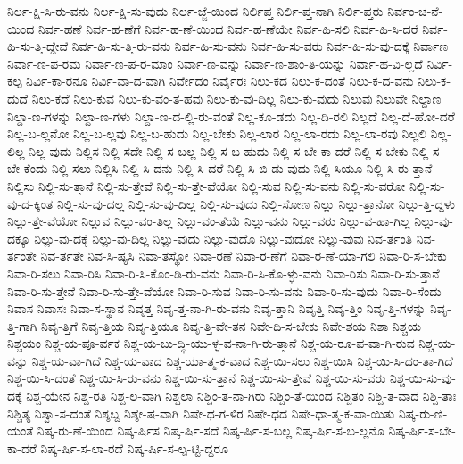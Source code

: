 {ನಿರ್ಲ-ಕ್ಷಿ-ಸಿ-ರು-ವನು
ನಿರ್ಲ-ಕ್ಷಿ-ಸು-ವುದು
ನಿರ್ಲ-ಜ್ಜೆ-ಯಿಂದ
ನಿರ್ಲಿಪ್ತ
ನಿರ್ಲಿ-ಪ್ತ-ನಾಗಿ
ನಿರ್ಲಿ-ಪ್ತರು
ನಿರ್ವಂ-ಚ-ನೆ-ಯಿಂದ
ನಿರ್ವ-ಹಣೆ
ನಿರ್ವ-ಹ-ಣೆಗೆ
ನಿರ್ವ-ಹ-ಣೆ-ಯಿಂದ
ನಿರ್ವ-ಹ-ಣೆಯೇ
ನಿರ್ವ-ಹಿ-ಸಲಿ
ನಿರ್ವ-ಹಿ-ಸಿ-ದರೆ
ನಿರ್ವ-ಹಿ-ಸು-ತ್ತಿ-ದ್ದೇವೆ
ನಿರ್ವ-ಹಿ-ಸು-ತ್ತಿ-ರು-ವನು
ನಿರ್ವ-ಹಿ-ಸು-ವನು
ನಿರ್ವ-ಹಿ-ಸು-ವರು
ನಿರ್ವ-ಹಿ-ಸು-ವು-ದಕ್ಕೆ
ನಿರ್ವಾಣ
ನಿರ್ವಾ-ಣ-ಪ-ರಮ
ನಿರ್ವಾ-ಣ-ಪ-ರ-ಮಾಂ
ನಿರ್ವಾ-ಣ-ವನ್ನು
ನಿರ್ವಾ-ಣ-ಶಾಂ-ತಿ-ಯನ್ನು
ನಿರ್ವಾ-ಹ-ವಿ-ಲ್ಲದೆ
ನಿರ್ವಿ-ಕಲ್ಪ
ನಿರ್ವಿ-ಕಾ-ರನೂ
ನಿರ್ವಿ-ವಾ-ದ-ವಾಗಿ
ನಿರ್ವೇದಂ
ನಿರ್ವೈರಃ
ನಿಲು-ಕದ
ನಿಲು-ಕ-ದಂತೆ
ನಿಲು-ಕ-ದ-ವನು
ನಿಲು-ಕ-ದುದೆ
ನಿಲು-ಕದೆ
ನಿಲು-ಕುವ
ನಿಲು-ಕು-ವಂ-ತ-ಹವು
ನಿಲು-ಕು-ವು-ದಿಲ್ಲ
ನಿಲು-ಕು-ವುದು
ನಿಲುವು
ನಿಲುವೇ
ನಿಲ್ದಾಣ
ನಿಲ್ದಾ-ಣ-ಗಳನ್ನು
ನಿಲ್ದಾ-ಣ-ಗಳು
ನಿಲ್ದಾ-ಣ-ದ-ಲ್ಲಿ-ರು-ವಂತೆ
ನಿಲ್ಲ-ಕೂ-ಡದು
ನಿಲ್ಲ-ದಿ-ರಲಿ
ನಿಲ್ಲದೆ
ನಿಲ್ಲ-ದೆ-ಹೋ-ದರೆ
ನಿಲ್ಲ-ಬ-ಲ್ಲನೋ
ನಿಲ್ಲ-ಬ-ಲ್ಲವು
ನಿಲ್ಲ-ಬ-ಹುದು
ನಿಲ್ಲ-ಬೇಕು
ನಿಲ್ಲ-ಲಾರ
ನಿಲ್ಲ-ಲಾ-ರದು
ನಿಲ್ಲ-ಲಾ-ರವು
ನಿಲ್ಲಲಿ
ನಿಲ್ಲ-ಲಿಲ್ಲ
ನಿಲ್ಲ-ವುದು
ನಿಲ್ಲಿಸ
ನಿಲ್ಲಿ-ಸದೇ
ನಿಲ್ಲಿ-ಸ-ಬಲ್ಲ
ನಿಲ್ಲಿ-ಸ-ಬ-ಹುದು
ನಿಲ್ಲಿ-ಸ-ಬೇ-ಕಾ-ದರೆ
ನಿಲ್ಲಿ-ಸ-ಬೇಕು
ನಿಲ್ಲಿ-ಸ-ಬೇ-ಕೆಂದು
ನಿಲ್ಲಿ-ಸಲು
ನಿಲ್ಲಿಸಿ
ನಿಲ್ಲಿ-ಸಿ-ದನು
ನಿಲ್ಲಿ-ಸಿ-ದರೆ
ನಿಲ್ಲಿ-ಸಿ-ಬಿ-ಡು-ವುದು
ನಿಲ್ಲಿ-ಸಿಯೂ
ನಿಲ್ಲಿ-ಸಿ-ರು-ತ್ತಾನೆ
ನಿಲ್ಲಿಸು
ನಿಲ್ಲಿ-ಸು-ತ್ತಾನೆ
ನಿಲ್ಲಿ-ಸು-ತ್ತೇವೆ
ನಿಲ್ಲಿ-ಸು-ತ್ತೇ-ವೆಯೋ
ನಿಲ್ಲಿ-ಸುವ
ನಿಲ್ಲಿ-ಸು-ವನು
ನಿಲ್ಲಿ-ಸು-ವರೋ
ನಿಲ್ಲಿ-ಸು-ವು-ದ-ಕ್ಕಿಂತ
ನಿಲ್ಲಿ-ಸು-ವು-ದಲ್ಲ
ನಿಲ್ಲಿ-ಸು-ವು-ದಿಲ್ಲ
ನಿಲ್ಲಿ-ಸು-ವುದು
ನಿಲ್ಲಿ-ಸೋಣ
ನಿಲ್ಲು
ನಿಲ್ಲು-ತ್ತಾನೋ
ನಿಲ್ಲು-ತ್ತಿ-ದ್ದಳು
ನಿಲ್ಲು-ತ್ತೇ-ವೆಯೋ
ನಿಲ್ಲುವ
ನಿಲ್ಲು-ವಂ-ತಿಲ್ಲ
ನಿಲ್ಲು-ವಂ-ತೆಯೆ
ನಿಲ್ಲು-ವನು
ನಿಲ್ಲು-ವರು
ನಿಲ್ಲು-ವ-ಹಾ-ಗಿಲ್ಲ
ನಿಲ್ಲು-ವು-ದಕ್ಕೂ
ನಿಲ್ಲು-ವು-ದಕ್ಕೆ
ನಿಲ್ಲು-ವು-ದಿಲ್ಲ
ನಿಲ್ಲು-ವುದು
ನಿಲ್ಲು-ವುದೊ
ನಿಲ್ಲು-ವುದೋ
ನಿಲ್ಲು-ವುವು
ನಿವ-ರ್ತಂತಿ
ನಿವ-ರ್ತಂತೇ
ನಿವ-ರ್ತತೇ
ನಿವ-ಸಿ-ಷ್ಯಸಿ
ನಿವಾ-ತಸ್ಥೋ
ನಿವಾ-ರಣೆ
ನಿವಾ-ರ-ಣೆಗೆ
ನಿವಾ-ರ-ಣೆ-ಯಾ-ಗಲಿ
ನಿವಾ-ರಿ-ಸ-ಬೇಕು
ನಿವಾ-ರಿ-ಸಲು
ನಿವಾ-ರಿಸಿ
ನಿವಾ-ರಿ-ಸಿ-ಕೊಂ-ಡಿ-ರು-ವನು
ನಿವಾ-ರಿ-ಸಿ-ಕೊ-ಳ್ಳು-ವನು
ನಿವಾ-ರಿಸು
ನಿವಾ-ರಿ-ಸು-ತ್ತಾನೆ
ನಿವಾ-ರಿ-ಸು-ತ್ತೇನೆ
ನಿವಾ-ರಿ-ಸು-ತ್ತೇ-ವೆಯೋ
ನಿವಾ-ರಿ-ಸುವ
ನಿವಾ-ರಿ-ಸು-ವನು
ನಿವಾ-ರಿ-ಸು-ವುದು
ನಿವಾ-ರಿ-ಸೆಂದು
ನಿವಾಸ
ನಿವಾಸಃ
ನಿವಾ-ಸ-ಸ್ಥಾನ
ನಿವೃತ್ತ
ನಿವೃ-ತ್ತ-ನಾ-ಗಿ-ರು-ವನು
ನಿವೃ-ತ್ತಾನಿ
ನಿವೃತ್ತಿ
ನಿವೃ-ತ್ತಿಂ
ನಿವೃ-ತ್ತಿ-ಗಳನ್ನು
ನಿವೃ-ತ್ತಿ-ಗಾಗಿ
ನಿವೃ-ತ್ತಿಗೆ
ನಿವೃ-ತ್ತಿಯ
ನಿವೃ-ತ್ತಿಯೂ
ನಿವೃ-ತ್ತಿ-ವೇ-ತನ
ನಿವೇ-ದಿ-ಸ-ಬೇಕು
ನಿವೇ-ಶಯ
ನಿಶಾ
ನಿಶ್ಚಯ
ನಿಶ್ಚಯಂ
ನಿಶ್ಚ-ಯ-ಪೂ-ರ್ವಕ
ನಿಶ್ಚ-ಯ-ಬು-ದ್ಧಿ-ಯು-ಳ್ಳ-ವ-ನಾ-ಗಿ-ರು-ತ್ತಾನೆ
ನಿಶ್ಚ-ಯ-ರೂ-ಪ-ವಾ-ಗಿ-ರುವ
ನಿಶ್ಚ-ಯ-ವನ್ನು
ನಿಶ್ಚ-ಯ-ವಾ-ಗಿದೆ
ನಿಶ್ಚ-ಯ-ವಾದ
ನಿಶ್ಚ-ಯಾ-ತ್ಮ-ಕ-ವಾದ
ನಿಶ್ಚ-ಯಿ-ಸಲು
ನಿಶ್ಚ-ಯಿಸಿ
ನಿಶ್ಚ-ಯಿ-ಸಿ-ದಂ-ತಾ-ಗಿದೆ
ನಿಶ್ಚ-ಯಿ-ಸಿ-ದಂತೆ
ನಿಶ್ಚ-ಯಿ-ಸಿ-ರು-ವನು
ನಿಶ್ಚ-ಯಿ-ಸು-ತ್ತಾನೆ
ನಿಶ್ಚ-ಯಿ-ಸು-ತ್ತೇವೆ
ನಿಶ್ಚ-ಯಿ-ಸು-ವರು
ನಿಶ್ಚ-ಯಿ-ಸು-ವು-ದಕ್ಕೆ
ನಿಶ್ಚ-ಯೇನ
ನಿಶ್ಚ-ರತಿ
ನಿಶ್ಚ-ಲ-ವಾಗಿ
ನಿಶ್ಚಲಾ
ನಿಶ್ಚಿಂ-ತ-ನಾ-ಗಿರು
ನಿಶ್ಚಿಂ-ತೆ-ಯಿಂದ
ನಿಶ್ಚಿತಂ
ನಿಶ್ಚಿ-ತ-ವಾದ
ನಿಶ್ಚಿ-ತಾಃ
ನಿಶ್ಚಿತ್ಯ
ನಿಶ್ವಾ-ಸ-ದಂತೆ
ನಿಶ್ಶಬ್ದ
ನಿಶ್ಶೇ-ಷ-ವಾಗಿ
ನಿಷೇ-ಧ-ಗ-ಳಿರ
ನಿಷೇ-ಧದ
ನಿಷೇ-ಧಾ-ತ್ಮ-ಕ-ವಾ-ಯಿತು
ನಿಷ್ಕ-ರು-ಣಿ-ಯಂತೆ
ನಿಷ್ಕ-ರು-ಣೆ-ಯಿಂದ
ನಿಷ್ಕ-ರ್ಷಿಸ
ನಿಷ್ಕ-ರ್ಷಿ-ಸದೆ
ನಿಷ್ಕ-ರ್ಷಿ-ಸ-ಬಲ್ಲ
ನಿಷ್ಕ-ರ್ಷಿ-ಸ-ಬ-ಲ್ಲನೊ
ನಿಷ್ಕ-ರ್ಷಿ-ಸ-ಬೇ-ಕಾ-ದರೆ
ನಿಷ್ಕ-ರ್ಷಿ-ಸ-ಲಾ-ರದೆ
ನಿಷ್ಕ-ರ್ಷಿ-ಸ-ಲ್ಪ-ಟ್ಟಿ-ದ್ದರೂ
}
